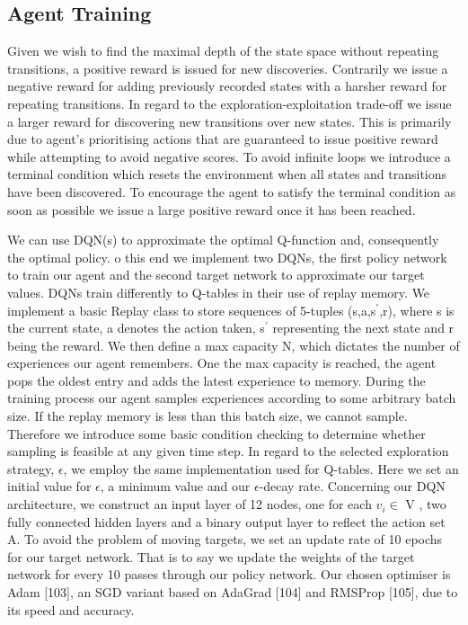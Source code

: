 \documentclass[runningheads]{llncs}
\begin{document}
\subsection{Agent Training}
Given we wish to find the maximal depth of the state space without repeating transitions,
a positive reward is issued for new discoveries. Contrarily we issue a negative reward
for adding previously recorded states with a harsher reward for repeating transitions. In
regard to the exploration-exploitation trade-off we issue a larger reward for discovering
new transitions over new states. This is primarily due to agent’s prioritising actions that
are guaranteed to issue positive reward while attempting to avoid negative scores. To avoid
infinite loops we introduce a terminal condition which resets the environment when all
states and transitions have been discovered. To encourage the agent to satisfy the terminal
condition as soon as possible we issue a large positive reward once it has been reached.

We can use
DQN(s) to approximate the optimal Q-function and, consequently the optimal policy. o this end we implement two DQNs, the first policy network to train our agent
and the second target network to approximate our target values. DQNs train differently
to Q-tables in their use of replay memory. We implement a basic Replay class to store
sequences of 5-tuples (s,a,s$^{\prime}$,r), where s is the current state, a denotes the action taken,
s$^{\prime}$ representing the next state and r being the reward. We then define a max capacity N,
which dictates the number of experiences our agent remembers. One the max capacity
is reached, the agent pops the oldest entry and adds the latest experience to memory.
During the training process our agent samples experiences according to some arbitrary
batch size. If the replay memory is less than this batch size, we cannot sample. Therefore
we introduce some basic condition checking to determine whether sampling is feasible at
any given time step. In regard to the selected exploration strategy, $\epsilon$, we employ the same
implementation used for Q-tables. Here we set an initial value for $\epsilon$, a minimum value
and our $\epsilon$-decay rate. Concerning our DQN architecture, we construct an input layer of 12
nodes, one for each $v_{i} \in$ V , two fully connected hidden layers and a binary output layer to
reflect the action set A. To avoid the problem of moving targets, we set an update rate of 10
epochs for our target network. That is to say we update the weights of the target network for every 10 passes through our policy network. Our chosen optimiser is Adam [103], an
SGD variant based on AdaGrad [104] and RMSProp [105], due to its speed and accuracy.
\end{document}
